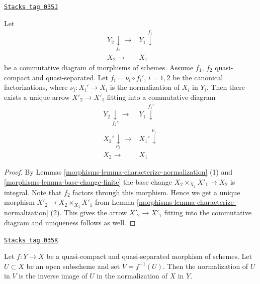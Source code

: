 \begin{lemma}
\label{morphisms-lemma-functoriality-normalization}
\href{https://stacks.math.columbia.edu/tag/035J}{\texttt{Stacks tag 035J}}

Let
$$
\begin{array}{cc}Y_2 \underset{f_2}{\downarrow}\longrightarrow & Y_1 \overset{f_1}{\downarrow} \\ X_2 \longrightarrow & X_1\end{array}
$$
be a commutative diagram of morphisms of schemes.
Assume $f_1$, $f_2$ quasi-compact and quasi-separated.
Let $f_i = \nu_i \circ f_i'$, $i = 1, 2$
be the canonical factorizations, where $\nu_i : X_i' \to X_i$ is
the normalization of $X_i$ in $Y_i$. Then there exists a unique
arrow $X'_2 \to X'_1$ fitting into a
commutative diagram
$$
\begin{array}{cc}Y_2 \underset{f_2'}{\downarrow}\longrightarrow & Y_1 \overset{f_1'}{\downarrow} \\ X_2' \underset{\nu_2}{\downarrow}\longrightarrow & X_1' \overset{\nu_1}{\downarrow} \\ X_2 \longrightarrow & X_1\end{array}
$$
\end{lemma}

\begin{proof}

By Lemmas \ref{morphisms-lemma-characterize-normalization} (1)
and \ref{morphisms-lemma-base-change-finite}
the base change $X_2 \times_{X_1} X'_1 \to X_2$
is integral. Note that $f_2$ factors through this morphism.
Hence we get a unique morphism
$X'_2 \to X_2 \times_{X_1} X'_1$ from
Lemma \ref{morphisms-lemma-characterize-normalization} (2).
This gives the arrow $X'_2 \to X'_1$ fitting into
the commutative diagram and uniqueness follows as well.
\end{proof}

\begin{lemma}
\label{morphisms-lemma-normalization-localization}
\href{https://stacks.math.columbia.edu/tag/035K}{\texttt{Stacks tag 035K}}

Let $f : Y \to X$ be a quasi-compact and quasi-separated morphism of schemes.
Let $U \subset X$ be an open subscheme and set $V = f^{-1}(U)$.
Then the normalization of $U$ in $V$ is the inverse image of $U$
in the normalization of $X$ in $Y$.
\end{lemma}

